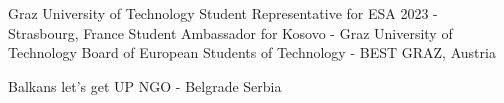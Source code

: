 %
%
%

\begin{scholarship}
					{Graz University of Technology Student Representative for ESA 2023 - Strasbourg, France}
					{Student Ambassador for Kosovo - Graz University of Technology}
					{Board of European Students of Technology - BEST GRAZ, Austria}
    
	{Balkans let's get UP NGO - Belgrade Serbia}				
     					
	
					
\end{scholarship}